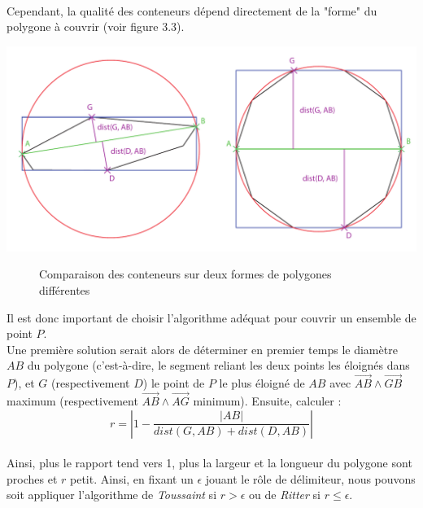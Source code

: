 \documentclass[a4paper, 12pt]{report}
\begin{document}
\paragraph{}
Cependant, la qualité des conteneurs dépend directement de la "forme" du polygone à couvrir (voir figure 3.3).
\begin{center}
\includegraphics[width=1\textwidth]{comparaison.pdf}
\begin{figure}[!h]
\caption{Comparaison des conteneurs sur deux formes de polygones différentes}
\end{figure}\end{center}
 Il est donc important de choisir l'algorithme adéquat pour couvrir un ensemble de point $P$. \\
Une première solution serait alors de déterminer en premier temps le diamètre $AB$ du polygone (c'est-à-dire, le segment reliant les deux points les éloignés dans $P$), et $G$ (respectivement $D$) le point de $P$ le plus éloigné de $AB$ avec $\vec{AB} \wedge \vec{GB}$ maximum (respectivement $\vec{AB} \wedge \vec{AG}$ minimum). Ensuite, calculer : \[ r = |1 - \frac{|AB|}{dist(G, AB)+ dist(D, AB)}| \] \\
Ainsi, plus le rapport tend vers 1, plus la largeur et la longueur du polygone sont proches et $r$ petit. Ainsi, en fixant un $\epsilon$ jouant le rôle de délimiteur, nous pouvons soit appliquer l'algorithme de \emph{Toussaint} si $r > \epsilon$ ou de \emph{Ritter} si $r \leq \epsilon$.
\end{document}
